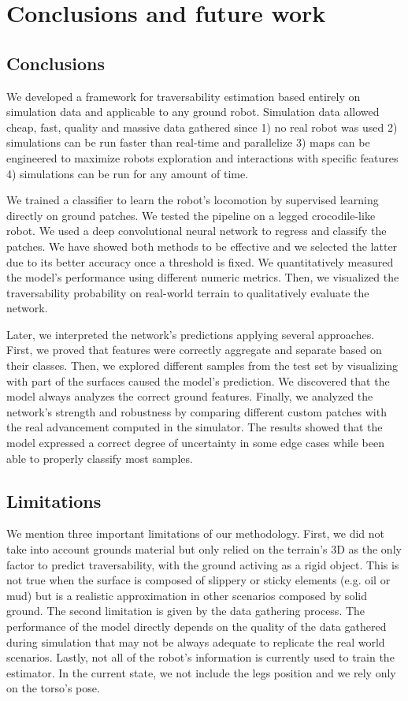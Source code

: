 \documentclass[../document.tex]{subfiles}
\begin{document}
\chapter{Conclusions and future work}
\label{chap : conclusions}
\section{Conclusions}
We developed a framework for traversability estimation based entirely on simulation data and applicable to any ground robot. Simulation data allowed cheap, fast, quality and massive data gathered since 1) no real robot was used 2) simulations can be run faster than real-time and parallelize 3) maps can be engineered to maximize robots exploration and interactions with specific features 4) simulations can be run for any amount of time. 

We trained a classifier to learn the robot's locomotion by supervised learning directly on ground patches. We tested the pipeline on a legged crocodile-like robot. 
We used a deep convolutional neural network to regress and classify the patches. We have showed both methods to be effective and we selected the latter due to its better accuracy once a threshold is fixed. We quantitatively measured the model's performance using different numeric metrics. Then, we visualized the traversability probability on real-world terrain to qualitatively evaluate the network. 

Later, we interpreted the network's predictions applying several approaches. First, we proved that features were correctly aggregate and separate based on their classes. Then, we explored different samples from the test set by visualizing with part of the surfaces caused the model's prediction. We discovered that the model always analyzes the correct ground features. Finally, we analyzed the network's strength and robustness by comparing different custom patches with the real advancement computed in the simulator. The results showed that the model expressed a correct degree of uncertainty in some edge cases while been able to properly classify most samples.
\section{Limitations}
We mention three important limitations of our methodology. First, we did not take into account grounds material but only relied on the terrain's 3D as the only factor to predict traversability, with the ground activing as a rigid object. This is not true when the surface is composed of slippery or sticky elements (e.g. oil or mud) but is a realistic approximation in other scenarios composed by solid ground. The second limitation is given by the data gathering process. The performance of the model directly depends on the quality of the data gathered during simulation that may not be always adequate to replicate the real world scenarios. Lastly, not all of the robot's information is currently used to train the estimator. In the current state, we not include the legs position and we rely only on the torso's pose.  
\end{document}
